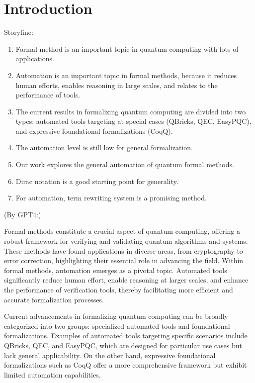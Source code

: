 \documentclass[manuscript, review, timestamp]{acmart}
\begin{document}
\clearpage
\tableofcontents

\clearpage

\section{Introduction}
Storyline:
\begin{enumerate}
    \item Formal method is an important topic in quantum computing with lots of applications.
    \item Automation is an important topic in formal methods, because it reduces human efforts, enables reasoning in large scales, and relates to the performance of tools.
    \item The current results in formalizing quantum computing are divided into two types: automated tools targeting at special cases (QBricks, QEC, EasyPQC), and expressive foundational formalizations (CoqQ).
    \item The automation level is still low for general formalization.
    \item Our work explores the general automation of quantum formal methods.
    \item Dirac notation is a good starting point for generality.
    \item For automation, term rewriting system is a promising method.
\end{enumerate}


(By GPT4:)

Formal methods constitute a crucial aspect of quantum computing, offering a robust framework for verifying and validating quantum algorithms and systems. These methods have found applications in diverse areas, from cryptography to error correction, highlighting their essential role in advancing the field. Within formal methods, automation emerges as a pivotal topic. Automated tools significantly reduce human effort, enable reasoning at larger scales, and enhance the performance of verification tools, thereby facilitating more efficient and accurate formalization processes.

Current advancements in formalizing quantum computing can be broadly categorized into two groups: specialized automated tools and foundational formalizations. Examples of automated tools targeting specific scenarios include QBricks, QEC, and EasyPQC, which are designed for particular use cases but lack general applicability. On the other hand, expressive foundational formalizations such as CoqQ offer a more comprehensive framework but exhibit limited automation capabilities.
\end{document}
